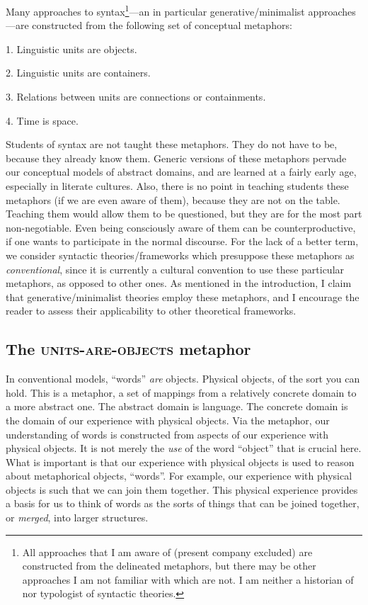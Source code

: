   Many approaches to syntax\footnote{All approaches that I am aware of (present company excluded) are constructed from the delineated metaphors, but there may be other approaches I am not familiar with which are not. I am neither a historian of nor typologist of syntactic theories.}—an in particular generative/minimalist approaches—are constructed from the following set of conceptual metaphors: 

1. Linguistic units are objects.

2. Linguistic units are containers.

3. Relations between units are connections or containments.

4. Time is space.

  Students of syntax are not taught these metaphors. They do not have to be, because they already know them. Generic versions of these metaphors pervade our conceptual models of abstract domains, and are learned at a fairly early age, especially in literate cultures. Also, there is no point in teaching students these metaphors (if we are even aware of them), because they are not on the table. Teaching them would allow them to be questioned, but they are for the most part non-negotiable. Even being consciously aware of them can be counterproductive, if one wants to participate in the normal discourse. For the lack of a better term, we consider syntactic theories/frameworks which presuppose these metaphors as \textit{conventional}, since it is currently a cultural convention to use these particular metaphors, as opposed to other ones. As mentioned in the introduction, I claim that generative/minimalist theories employ these metaphors, and I encourage the reader to assess their applicability to other theoretical frameworks.

\subsection{{The} {\textsc{units-}}{\textsc{are}}{\textsc{{}-objects}}{ metaphor}} 

In conventional models, “words” \textit{are} objects. Physical objects, of the sort you can hold. This is a metaphor, a set of mappings from a relatively concrete domain to a more abstract one. The abstract domain is language. The concrete domain is the domain of our experience with physical objects. Via the metaphor, our understanding of words is constructed from aspects of our experience with physical objects. It is not merely the \textit{use} of the word “object” that is crucial here. What is important is that our experience with physical objects is used to reason about metaphorical objects, “words”. For example, our experience with physical objects is such that we can join them together. This physical experience provides a basis for us to think of words as the sorts of things that can be joined together, or \textit{merged}, into larger structures.

